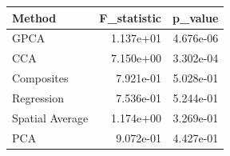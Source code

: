 \begin{tabular}{lrr}
\toprule
Method & F_statistic & p_value \\
\midrule
GPCA & 1.137e+01 & 4.676e-06 \\
CCA & 7.150e+00 & 3.302e-04 \\
Composites & 7.921e-01 & 5.028e-01 \\
Regression & 7.536e-01 & 5.244e-01 \\
Spatial Average & 1.174e+00 & 3.269e-01 \\
PCA & 9.072e-01 & 4.427e-01 \\
\bottomrule
\end{tabular}
